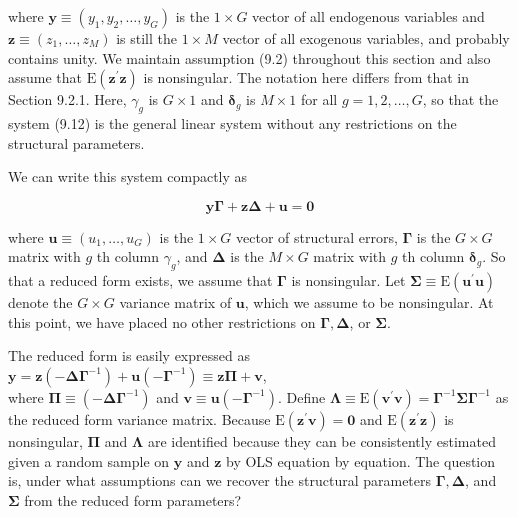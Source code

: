 \documentclass[10pt]{article}
\begin{document}
where $\mathbf{y} \equiv\left(y_{1}, y_{2}, \ldots, y_{G}\right)$ is the $1 \times G$ vector of all endogenous variables and $\mathbf{z} \equiv \left(z_{1}, \ldots, z_{M}\right)$ is still the $1 \times M$ vector of all exogenous variables, and probably contains unity. We maintain assumption (9.2) throughout this section and also assume that $\mathrm{E}\left(\mathbf{z}^{\prime} \mathbf{z}\right)$ is nonsingular. The notation here differs from that in Section 9.2.1. Here, $\gamma_{g}$ is $G \times 1$ and $\boldsymbol{\delta}_{g}$ is $M \times 1$ for all $g=1,2, \ldots, G$, so that the system (9.12) is the general linear system without any restrictions on the structural parameters.

We can write this system compactly as


\begin{equation*}
\mathbf{y} \boldsymbol{\Gamma}+\mathbf{z} \boldsymbol{\Delta}+\mathbf{u}=\mathbf{0} \tag{9.13}
\end{equation*}


where $\mathbf{u} \equiv\left(u_{1}, \ldots, u_{G}\right)$ is the $1 \times G$ vector of structural errors, $\boldsymbol{\Gamma}$ is the $G \times G$ matrix with $g$ th column $\gamma_{g}$, and $\boldsymbol{\Delta}$ is the $M \times G$ matrix with $g$ th column $\boldsymbol{\delta}_{g}$. So that a reduced form exists, we assume that $\boldsymbol{\Gamma}$ is nonsingular. Let $\boldsymbol{\Sigma} \equiv \mathrm{E}\left(\mathbf{u}^{\prime} \mathbf{u}\right)$ denote the $G \times G$ variance matrix of $\mathbf{u}$, which we assume to be nonsingular. At this point, we have placed no other restrictions on $\boldsymbol{\Gamma}, \boldsymbol{\Delta}$, or $\boldsymbol{\Sigma}$.

The reduced form is easily expressed as\\
$\mathbf{y}=\mathbf{z}\left(-\boldsymbol{\Delta} \boldsymbol{\Gamma}^{-1}\right)+\mathbf{u}\left(-\boldsymbol{\Gamma}^{-1}\right) \equiv \mathbf{z} \boldsymbol{\Pi}+\mathbf{v}$,\\
where $\boldsymbol{\Pi} \equiv\left(-\boldsymbol{\Delta} \boldsymbol{\Gamma}^{-1}\right)$ and $\mathbf{v} \equiv \mathbf{u}\left(-\boldsymbol{\Gamma}^{-1}\right)$. Define $\boldsymbol{\Lambda} \equiv \mathrm{E}\left(\mathbf{v}^{\prime} \mathbf{v}\right)=\boldsymbol{\Gamma}^{-1} \boldsymbol{\Sigma} \boldsymbol{\Gamma}^{-1}$ as the reduced form variance matrix. Because $\mathrm{E}\left(\mathbf{z}^{\prime} \mathbf{v}\right)=\mathbf{0}$ and $\mathrm{E}\left(\mathbf{z}^{\prime} \mathbf{z}\right)$ is nonsingular, $\boldsymbol{\Pi}$ and $\boldsymbol{\Lambda}$ are identified because they can be consistently estimated given a random sample on $\mathbf{y}$ and $\mathbf{z}$ by OLS equation by equation. The question is, under what assumptions can we recover the structural parameters $\boldsymbol{\Gamma}, \boldsymbol{\Delta}$, and $\boldsymbol{\Sigma}$ from the reduced form parameters?
\end{document}
